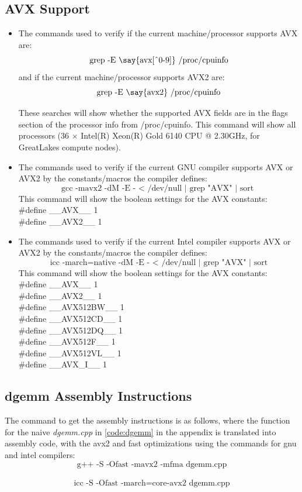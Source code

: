 \documentclass[letterpaper]{article}
\begin{document}
\subsection{AVX Support}
\begin{itemize}
	\item The commands used to verify if the current machine/processor supports AVX are:
	$$ \textrm{grep -E \say{avx[\^{}0-9]} /proc/cpuinfo}$$
	and if the current machine/processor supports AVX2 are:
	$$ \textrm{grep -E \say{avx2} /proc/cpuinfo}$$ 

	These searches will show whether the supported AVX fields are in the flags section of the processor info from /proc/cpuinfo. This command will show all processors (36 $\times$ Intel(R) Xeon(R) Gold 6140 CPU @ 2.30GHz, for GreatLakes compute nodes).
	
	\item The commands used to verify if the current GNU compiler supports AVX or AVX2 by the constants/macros the compiler defines:
	$$ \textrm{gcc -mavx2 -dM -E - < /dev/null | grep "AVX" | sort } $$
	This command will show the boolean settings for the AVX constants:\\
	\#define \_\_AVX\_\_ 1 \\
	\#define \_\_AVX2\_\_ 1 \\
	
	\item The commands used to verify if the current Intel compiler supports AVX or AVX2 by the constants/macros the compiler defines:
	$$\textrm{ icc -march=native -dM -E - < /dev/null | grep "AVX" | sort } $$
	This command will show the boolean settings for the AVX constants:\\
	\#define \_\_AVX\_\_ 1 \\
	\#define \_\_AVX2\_\_ 1 \\
	\#define \_\_AVX512BW\_\_ 1 \\
	\#define \_\_AVX512CD\_\_ 1 \\
	\#define \_\_AVX512DQ\_\_ 1 \\
	\#define \_\_AVX512F\_\_ 1 \\
	\#define \_\_AVX512VL\_\_ 1 \\
	\#define \_\_AVX\_I\_\_ 1 \\
\end{itemize}

\subsection{dgemm Assembly Instructions}
The command to get the assembly instructions is as follows, where the function for the naive \textit{dgemm.cpp} in \cref{code:dgemm} in the appendix is translated into assembly code, with the avx2 and fast optimizations using the commands for gnu and intel compilers:
$$\textrm{g++ -S -Ofast -mavx2 -mfma dgemm.cpp} $$ \\
$$\textrm{icc -S -Ofast -march=core-avx2 dgemm.cpp} $$ \\
\end{document}

